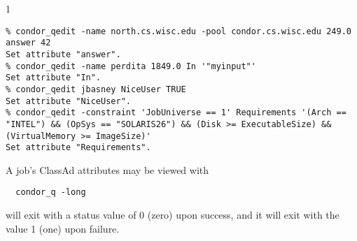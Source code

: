 \begin{ManPage}{\label{man-condor-qedit}}{1}
\Examples
\footnotesize
\begin{verbatim}
% condor_qedit -name north.cs.wisc.edu -pool condor.cs.wisc.edu 249.0 answer 42
Set attribute "answer".
% condor_qedit -name perdita 1849.0 In '"myinput"'
Set attribute "In".
% condor_qedit jbasney NiceUser TRUE
Set attribute "NiceUser".
% condor_qedit -constraint 'JobUniverse == 1' Requirements '(Arch == "INTEL") && (OpSys == "SOLARIS26") && (Disk >= ExecutableSize) && (VirtualMemory >= ImageSize)'
Set attribute "Requirements".
\end{verbatim}
\normalsize

\GenRem
A job's ClassAd attributes may be viewed with 
\begin{verbatim}
  condor_q -long
\end{verbatim}

\ExitStatus

 will exit with a status value of 0 (zero) upon success,
and it will exit with the value 1 (one) upon failure.

\end{ManPage}
